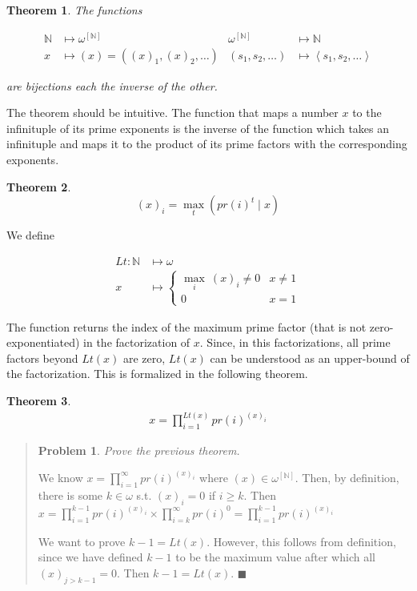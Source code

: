 \documentclass[a4paper, 12pt]{article}
\newtheorem{problem}{Problem}
\newtheorem{theorem}{Theorem}
\newtheorem{problem}{Problem}
\newtheorem{theorem}{Theorem}
\begin{document}
\begin{theorem}
    The functions 

    \begin{align*}
        \mathbb{N} &\mapsto \omega^{[\mathbb{N}]} &
        \omega^{[\mathbb{N}]}&\mapsto \mathbb{N} \\  
        x &\mapsto (x) = \left( (x)_1, (x)_2, \ldots \right) & (s_1, s_2,
        \ldots)&\mapsto \left\langle  s_1, s_2,\ldots  \right\rangle
    \end{align*}

    are bijections each the inverse of the other.
\end{theorem}

The theorem should be intuitive. The function that maps a number $x$ to the
infinituple of its prime exponents is the inverse of the function which takes an
infinituple and maps it to the product of its prime factors with the
corresponding exponents.

\begin{theorem}
    $$(x)_i = \max_{t} \left( pr(i)^{t} \mid x \right) $$
\end{theorem}

We define 

\begin{align*}
    Lt : \mathbb{N} &\mapsto \omega \\ 
    x &\mapsto \begin{cases}
        \max_{i} ~ (x)_i \neq 0 & x \neq 1 \\ 
        0 & x = 1
    \end{cases}
\end{align*}

The function returns the index of the maximum prime factor (that is not
zero-exponentiated) in the factorization of $x$. Since, in this factorizations,
all prime factors beyond $Lt(x)$ are zero, $Lt(x)$ can be understood as an
upper-bound of the factorization. This is formalized in the following theorem.

\begin{theorem}
    \begin{align*}
        x = \prod_{i=1}^{Lt(x)}  pr(i)^{(x)_i}
    \end{align*}
\end{theorem}


\small
\begin{quote}


\begin{problem}
    Prove the previous theorem.
\end{problem}

We know $x = \prod_{i=1}^{\infty} pr(i)^{(x)_i}  $ where $(x) \in
\omega^{[\mathbb{N}]}$. Then, by definition, there is some $k \in \omega$ s.t. $(x)_i = 0$
if $i \geq k$. Then $x = \prod_{i=1}^{k - 1} pr(i)^{(x)_i} \times \prod_{i=k}^{\infty}
pr(i)^{0} = \prod_{i=1}^{k-1} pr(i)^{(x)_i}     $

We want to prove $k - 1 = Lt(x)$. However, this follows from definition, since
we have defined $k - 1$ to be the maximum value after which all $(x)_{j > k -1}
= 0$. Then $k - 1 = Lt(x)$. $\blacksquare$


\end{quote}
\normalsize
\end{document}
